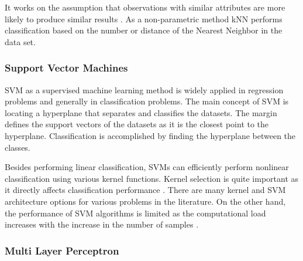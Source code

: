 It works on the assumption that observations with similar attributes are more likely to produce similar results \cite{richman2011multivariate}. As a non-parametric method kNN performs classification based on the number or distance of the Nearest Neighbor in the data set.

\subsubsection{Support Vector Machines}

SVM as a supervised machine learning method is widely applied in regression problems and generally in classification problems. The main concept of SVM is locating a hyperplane that separates and classifies the datasets. The margin defines the support vectors of the datasets as it is the closest point to the hyperplane. Classification is accomplished by finding the hyperplane between the classes.

Besides performing linear classification, SVMs can efficiently perform nonlinear classification using various kernel functions. Kernel selection is quite important as it directly affects classification performance \cite{liu2018artificial}. There are many kernel and SVM architecture options for various problems in the literature. On the other hand, the performance of SVM algorithms is limited as the computational load increases with the increase in the number of samples \cite{haykin2010neural}. 

\subsubsection{Multi Layer Perceptron}

